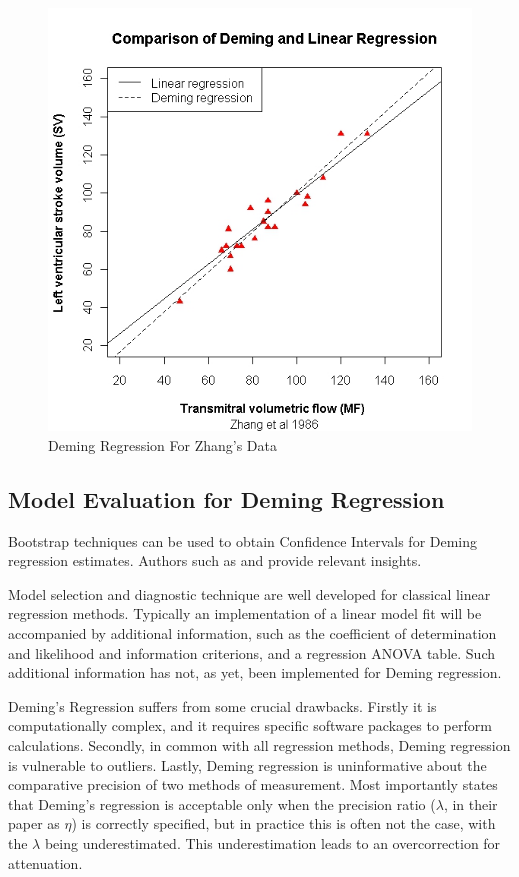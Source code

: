 \documentclass[12pt, a4paper]{report}
\theoremstyle{plain}
\theoremstyle{definition}
\theoremstyle{remark}
\begin{document}
	
	\begin{figure}[h!]
		\includegraphics[width=130mm]{images/ZhangDeming.jpeg}
		\caption{Deming Regression For Zhang's Data}\label{ZhangDeming}
	\end{figure}
	
	
	\subsection{Model Evaluation for Deming Regression}
	Bootstrap techniques can be used to obtain Confidence Intervals for Deming regression estimates. Authors such as 
	\citet{carpenter2000bootstrap} and \citet{johnson2001bootstrap} provide relevant insights.
	
	
	
	
	Model selection and diagnostic technique are well developed for classical linear regression methods. Typically an implementation of a linear model fit will be accompanied by additional information, such as the coefficient of determination and likelihood and information criterions, and a regression ANOVA table. Such additional information has not, as yet, been implemented for Deming regression.
	
	Deming's Regression suffers from some crucial drawbacks. Firstly it is computationally complex, and it requires specific software packages to perform calculations. Secondly, in common with all regression methods, Deming regression is vulnerable to outliers. Lastly, Deming regression is uninformative
	about the comparative precision of two methods of measurement. Most importantly \citet{CarollRupert} states that Deming's regression is acceptable only when the precision ratio ($\lambda$, in their paper as $\eta$) is correctly specified, but in practice this is often not the case, with the $\lambda$ being underestimated. This underestimation leads to an overcorrection for attenuation.
	
\end{document}
